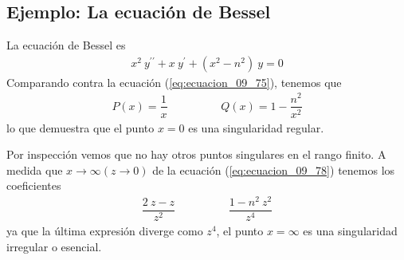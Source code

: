 \subsection*{Ejemplo: La ecuación de Bessel}
La ecuación de Bessel es
\begin{align}
x^{2} \: y^{\prime \prime} + x \: y^{\prime} + (x^{2} - n^{2}) \: y = 0
\label{eq:ecuacion_09_79}
\end{align}
Comparando contra la ecuación (\ref{eq:ecuacion_09_75}), tenemos que
\begin{align*}
P(x) =  \dfrac{1}{x} \hspace{2cm} Q(x) = 1 - \dfrac{n^{2}}{x^{2}}
\end{align*}
lo que demuestra que el punto $x = 0$ es una singularidad regular.
\par
Por inspección vemos que no hay otros puntos singulares en el rango finito. A medida que $x \to \infty (z \to 0)$ de la ecuación (\ref{eq:ecuacion_09_78}) tenemos los coeficientes
\begin{align*}
\dfrac{2 \:z - z}{z^{2}} \hspace{2cm} \dfrac{1 - n^{2} \: z^{2}}{z^{4}}
\end{align*}
ya que la última expresión diverge como $z^{4}$, el punto $x = \infty$ es una singularidad irregular o esencial.
